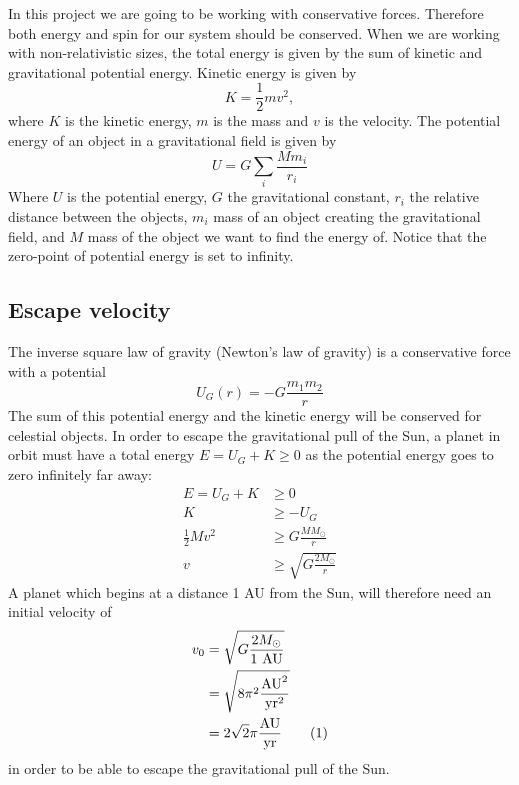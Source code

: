 \documentclass[reprint, english,notitlepage,nofootinbib]{revtex4-1}  %
\newcommand\numberthis{\addtocounter{equation}{1}\tag{\theequation}}
\begin{document}
In this project we are going to be working with conservative forces. Therefore both energy and spin for our system should be conserved. When we are working with non-relativistic sizes, the total energy is given by the sum of kinetic and gravitational potential energy. Kinetic energy is given by
\begin{equation}
\label{eq:kinetic_energy}
K = \frac{1}{2}mv^2,
\end{equation}
where $K$ is the kinetic energy, $m$ is the mass and $v$ is the velocity. The potential energy of an object in a gravitational field is given by
\begin{equation}
\label{eq:potential_energy}
U = G\sum_{i}\frac{Mm_i}{r_i}
\end{equation}
Where $U$ is the potential energy, $G$ the gravitational constant, $r_i$ the relative distance between the objects, $m_i$ mass of an object creating the gravitational field, and $M$ mass of the object we want to find the energy of. Notice that the zero-point of potential energy is set to infinity.

\subsection{Escape velocity}

The inverse square law of gravity (Newton's law of gravity) is a conservative force with a potential
\begin{equation}
  \label{eq:pot_G}
  U_G(r) = - G \frac{m_1 m_2}{r}
\end{equation}
The sum of this potential energy and the kinetic energy will be conserved for celestial objects. In order to escape the gravitational pull of the Sun, a planet in orbit must have a total energy $E = U_G + K \ge 0$ as the potential energy goes to zero infinitely far away:
\begin{align*}
  E = U_G + K &\ge 0 \\
  K &\ge - U_G \\
  \frac{1}{2} M v^2 &\ge G \frac{M M_\odot}{r} \\
  v &\ge \sqrt{G \frac{2 M_\odot}{r}}
\end{align*}
A planet which begins at a distance 1 AU from the Sun, will therefore need an initial velocity of
\begin{align*}
  v_0 &= \sqrt{G \frac{2 M_\odot}{1 \text{ AU}}} \\
  &= \sqrt{8 \pi^2 \frac{\text{AU}^2}{\text{yr}^2}} \\
  &= 2 \sqrt 2 \pi \frac{\text{AU}}{\text{yr}} \numberthis \label{eq:escape_velocity}
\end{align*}
in order to be able to escape the gravitational pull of the Sun.
\end{document}
